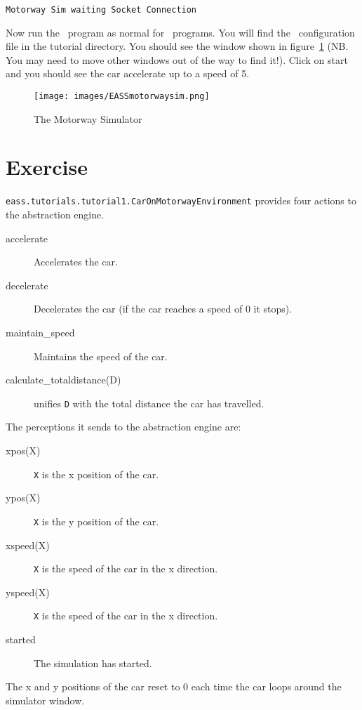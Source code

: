 \begin{verbatim}
Motorway Sim waiting Socket Connection
\end{verbatim}

Now run the \eass\ program as normal for
\ail\ programs.  You will find the \ail\ configuration file
in the tutorial directory.  You should see the window shown in
figure~\ref{fig:motorwaysim} (NB.  You may need to move other windows
out of the way to find it!).  Click on start and you should see the
car accelerate up to a speed of 5. 

\begin{figure}
\begin{center}
\texttt{[image: images/EASSmotorwaysim.png]}
\end{center}
\caption{The Motorway Simulator}
\label{fig:motorwaysim}
\end{figure}

\section{Exercise}

\texttt{eass.tutorials.tutorial1.CarOnMotorwayEnvironment} provides
four actions to the abstraction engine. 
\begin{description}
\item[accelerate] Accelerates the car.
\item[decelerate] Decelerates the car (if the car reaches a speed of 0 it stops).
\item[maintain\_speed] Maintains the speed of the car.
\item[calculate\_totaldistance(D)] unifies \texttt{D} with the total
  distance the car has travelled. 
\end{description}

The perceptions it sends to the abstraction engine are:
\begin{description}
\item[xpos(X)] \texttt{X} is the x position of the car.
\item[ypos(X)] \texttt{X} is the y position of the car.
\item[xspeed(X)] \texttt{X} is the speed of the car in the x direction.
\item[yspeed(X)] \texttt{X} is the  speed of the car in the x direction.
\item[started] The simulation has started.
\end{description}
The x and y positions of the car reset to 0 each time the car loops
around the simulator window. 

